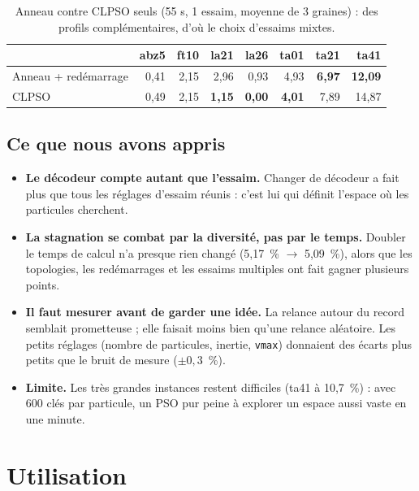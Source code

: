 \documentclass[11pt,a4paper]{article}
\begin{document}
\begin{table}[h]
\centering
\caption{Anneau contre CLPSO seuls (55 s, 1 essaim, moyenne de 3 graines) : des profils
complémentaires, d'où le choix d'essaims mixtes.}
\label{tab:ringcl}
\begin{tabular}{lrrrrrrr}
\toprule
 & abz5 & ft10 & la21 & la26 & ta01 & ta21 & ta41\\
\midrule
Anneau + redémarrage & 0,41 & 2,15 & 2,96 & 0,93 & 4,93 & \textbf{6,97} & \textbf{12,09}\\
CLPSO                & 0,49 & 2,15 & \textbf{1,15} & \textbf{0,00} & \textbf{4,01} & 7,89 & 14,87\\
\bottomrule
\end{tabular}
\end{table}

\subsection{Ce que nous avons appris}

\begin{itemize}
  \item \textbf{Le décodeur compte autant que l'essaim.} Changer de décodeur a fait plus
        que tous les réglages d'essaim réunis : c'est lui qui définit l'espace où les
        particules cherchent.
  \item \textbf{La stagnation se combat par la diversité, pas par le temps.} Doubler le
        temps de calcul n'a presque rien changé (5,17~\% $\to$ 5,09~\%), alors que les
        topologies, les redémarrages et les essaims multiples ont fait gagner plusieurs
        points.
  \item \textbf{Il faut mesurer avant de garder une idée.} La relance autour du record
        semblait prometteuse ; elle faisait moins bien qu'une relance aléatoire. Les petits
        réglages (nombre de particules, inertie, \texttt{vmax}) donnaient des écarts plus
        petits que le bruit de mesure ($\pm0{,}3$~\%).
  \item \textbf{Limite.} Les très grandes instances restent difficiles (ta41 à 10,7~\%) :
        avec 600 clés par particule, un PSO pur peine à explorer un espace aussi vaste en
        une minute.
\end{itemize}

\section{Utilisation}
\end{document}
